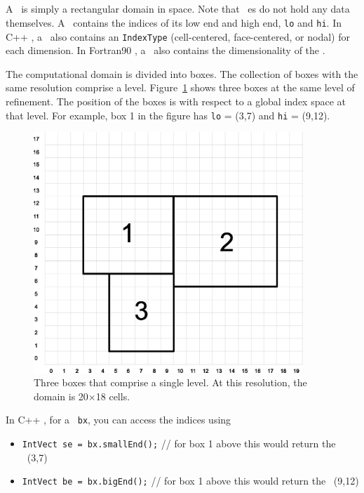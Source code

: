 \subsection{\BoxType}

A \BoxType\ is simply a rectangular domain in space.  Note that \BoxType~es
do not hold any data themselves. A \BoxType\ contains
the indices of its low end and high end, {\tt lo} and {\tt hi}.
In C++ \BoxLib, a \BoxType\ also
contains an {\tt IndexType} (cell-centered, face-centered, or nodal) for each
dimension.  In Fortran90 \BoxLib, a \BoxType\ also contains the dimensionality
of the \BoxType.

The computational domain is divided into boxes.  The collection of
boxes with the same resolution comprise a level.
Figure~\ref{fig:boxes} shows three boxes at the same level of
refinement.  The position of the boxes is with respect to a global
index space at that level.  For example, box 1 in the figure has 
{\tt lo} = (3,7) and {\tt hi} = (9,12).
\begin{figure}[h]
\centering
\includegraphics[width=4.0in]{./Introduction/index_grid2}
\caption{\label{fig:boxes} Three boxes that comprise a single level.
At this resolution, the domain is 20$\times$18 cells.}
\end{figure}

In C++ \BoxLib, for a \BoxType\ {\tt bx},
you can access the indices using
\begin{itemize}
\item {{\tt IntVect se = bx.smallEnd();} // for box 1 above this would return
      the \IntVect\ (3,7)}
\item {{\tt IntVect be = bx.bigEnd();} // for box 1 above this would return 
      the \IntVect\ (9,12)}
\end{itemize}

